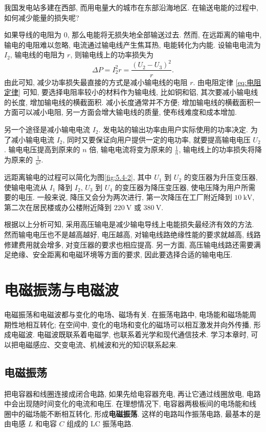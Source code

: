 \documentclass[UTF8,openany,fontset=fandol]{ctexbook}
\theoremstyle{chinesetextbook}
\newcommand{\unit}[1]{\ \mathrm{#1}}
\begin{document}
我国发电站多建在西部, 而用电量大的城市在东部沿海地区. 在输送电能的过程中, 如何减少能量的损失呢?

如果导线的电阻为 0, 那么电能将无损失地全部输送过去. 然而, 在远距离的输电中, 输电的电阻难以忽略, 电流通过输电线产生焦耳热, 电能转化为内能. 设输电电流为 $I_2$, 输电线的电阻为 $r$, 则输电线上的功率损失为
\[
\Delta P=I_2^2 r=\frac{(U_2-U_3)^2}{r}.
\]
由此可知, 减少功率损失最直接的方式是减小输电线的电阻 $r$. 由电阻定律 \eqref{eq:电阻定律} 可知, 要选择电阻率较小的材料作为输电线, 比如铜和铝, 其次要减小输电线的长度, 增加输电线的横截面积. 减小长度通常并不方便; 增加输电线的横截面积一方面可以减小电阻, 另一方面会增大输电线的质量, 使布线难度和成本增加.

另一个途径是减小输电电流 $I_2$. 发电站的输出功率由用户实际使用的功率决定. 为了减小输电电流 $I_2$, 同时又要保证向用户提供一定的电功率, 就要提高输电电压 $U_2$. 输电电压提高到原来的 $n$ 倍, 输电电流将变为原来的 $\displaystyle\frac{1}{n}$, 输电线上的功率损失将降为原来的 $\displaystyle\frac{1}{n^2}$.

远距离输电的过程可以简化为图\ref{fig:5.4-2}, 其中 $U_1$ 到 $U_2$ 的变压器为升压变压器, 使输电电流从 $I_1$ 降到 $I_2$, $U_3$ 到 $U_4$ 的变压器为降压变压器, 使电压降为用户所需要的电压. 一般来说, 降压又会分为两次进行, 第一次降压在工厂附近降到 $10\unit{kV}$, 第二次在居民楼或办公楼附近降到 $220\unit{V}$ 或 $380\unit{V}$.

根据以上分析可知, 采用高压输电是减少输电导线上电能损失最经济有效的方法. 然而输电电压也不是越高越好, 电压越高, 对输电线路绝缘性能的要求就越高, 线路修建费用就会增多, 对变压器的要求也相应提高. 另一方面, 高压输电线路还需要满足绝缘、安全距离和电磁环境等方面的要求, 因此要选择合适的输电电压.
\chapter{电磁振荡与电磁波}
电磁振荡和电磁波都与变化的电场、磁场有关. 在振荡电路中, 电场能和磁场能周期性地相互转化; 在空间中, 变化的电场和变化的磁场可以相互激发并向外传播, 形成电磁波. 电磁波既联系着电磁学, 也联系着光学和现代通信技术. 学习本章时, 可以把电磁感应、交变电流、机械波和光的知识联系起来.
\section{电磁振荡}
把电容器和线圈连接成闭合电路, 如果先给电容器充电, 再让它通过线圈放电, 电路中会出现随时间变化的电流和电压. 在理想情况下, 电容器两极板间的电场能和线圈中的磁场能不断相互转化, 形成\textbf{电磁振荡}. 这样的电路叫作振荡电路, 最基本的是由电感 $L$ 和电容 $C$ 组成的 LC 振荡电路.
\end{document}
